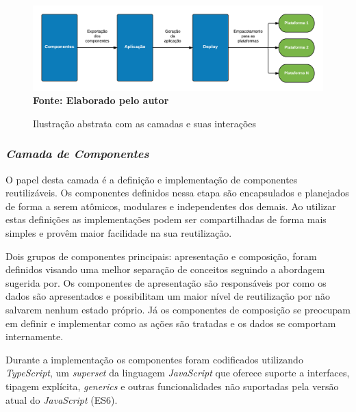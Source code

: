 \begin{figure}[ht]
	\centering	
	\caption[\hspace{0.1cm}Camadas Sugeridas pela Arquitetura.]{Ilustração abstrata com as camadas e suas interações}
	\vspace{-0.4cm}
	\includegraphics[width=1\textwidth]{figuras/Camadas.png}
	\vspace{-0.2cm}
	\\\textbf{\footnotesize Fonte: Elaborado pelo autor }
	\label{fig:figura6}
\end{figure}
\vspace{-0.5cm}

\subsubsection{{\it Camada de Componentes}}

O papel desta camada é a definição e implementação de componentes reutilizáveis. Os componentes definidos nessa etapa são encapsulados e planejados de forma a serem atômicos, modulares e independentes dos demais. Ao utilizar estas definições as implementações podem ser compartilhadas de forma mais simples e provêm maior facilidade na sua reutilização.

Dois grupos de componentes principais: apresentação e composição, foram definidos visando uma melhor separação de conceitos seguindo a abordagem sugerida por\cite{presentContainerAbramov}. Os componentes de apresentação são responsáveis por como os dados são apresentados e possibilitam um maior nível de reutilização por não salvarem nenhum estado próprio. Já os componentes de composição se preocupam em definir e implementar como as ações são tratadas e os dados se comportam internamente.

Durante a implementação os componentes foram codificados utilizando \textit{TypeScript}, um \textit{superset} da linguagem \textit{JavaScript} que oferece suporte a interfaces, tipagem explícita, \textit{generics} e outras funcionalidades não suportadas pela versão atual do \textit{JavaScript} (ES6).

